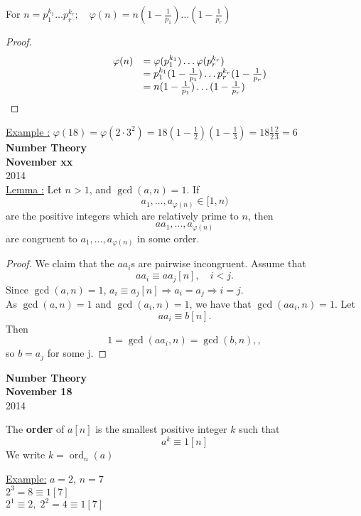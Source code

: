 \documentclass{report}
\DeclareMathOperator{\ord}{ord}
\begin{document}
\begin{thm}
				For $n=p_1^{k_1}\dots p_r^{k_r} ;\quad \varphi(n)=n(1-\frac{1}{p_1})\dots(1-\frac{1}{p_r})$
\end{thm}
\begin{proof}
					\[ 	\begin{array}{l c l}
							&\varphi(n)&=\varphi(p_1^{k_1})\dots\varphi(p_r^{k_r})\\
							&&=p_1^{k_1}(1-\frac{1}{p_1})\dots p_r^{k_r}(1-\frac{1}{p_r})\\
							&&=n(1-\frac{1}{p_1})\dots (1-\frac{1}{p_r})\\
							\end{array}
					\]
\end{proof}
\underline{Example :} $\varphi(18)=\varphi(2 \cdot 3^2)=18(1-\frac{1}{2})(1-\frac{1}{3}) = 18 \frac{1}{2} \frac{2}{3}=6$\\
\newpage
{\centering
\Large
\textbf{Number Theory}\\
\normalsize
\textbf{November xx}\\
2014\\
}
\vspace{10mm}
\underline{Lemma :} Let $n>1$, and $\gcd(a, n)=1$. If 
\begin{equation*}
a_1, \dots, a_{\varphi(n)}\in [1, n)
\end{equation*} 
are the positive integers which are relatively prime to $n$, then 
\begin{equation*}
aa_1, \dots, a_{\varphi(n)}
\end{equation*}
are congruent to $a_1, \dots, a_{\varphi(n)}$ in some order.
\begin{proof}
	We claim that the $aa_i$s are pairwise incongruent. Assume that
\begin{equation*}
aa_i\equiv aa_j[n], \quad i<j.
\end{equation*}
Since $\gcd(a, n) = 1$, $a_i\equiv a_j[n] \Rightarrow a_i=a_j \Rightarrow i=j$.\\
As $\gcd(a, n)=1$ and $\gcd(a_i, n) = 1$, we have that $\gcd(aa_i, n)=1$. Let 
\begin{equation*}
aa_i\equiv b[n].
\end{equation*}
Then 
\begin{equation*}
1=\gcd(aa_i, n) = \gcd(b, n),,
\end{equation*}
so $b=a_j$ for some j.
\end{proof}

\newpage
{\centering
	\Large
	\textbf{Number Theory}\\
	\normalsize
	\textbf{November 18}\\
	2014\\
}
\vspace{10mm}
\begin{defi} The \textbf{order} of $a[n]$ is the smallest positive integer $k$ such that
																\[ a^k \equiv 1 [n] \]
						We write $k= \ord_n(a)$
\end{defi}
\underline{Example:} $a=2$, $n=7$\\
	$2^3=8 \equiv 1 [7]$\\
	$2^1 \equiv 2, \; 2^2=4\equiv 1 [7]$\\
\end{document}
